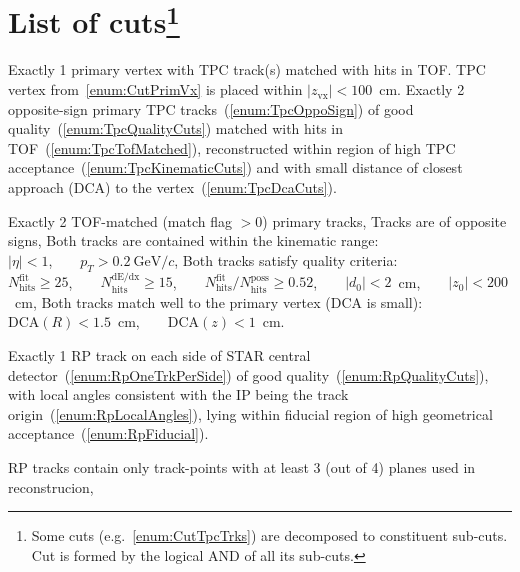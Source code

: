 \section[List of cuts]{List of cuts\footnote{Some cuts (e.g.~\ref{enum:CutTpcTrks}) are decomposed to constituent sub-cuts. Cut is formed by the logical AND of all its sub-cuts.}}\label{sec:listOfCuts}
\begin{enumerate}[label=\textbf{C\arabic*},ref=C\arabic*]
 \itemm Exactly 1 primary vertex with TPC track(s) matched with hits in TOF.\label{enum:CutPrimVx}
 \itemm TPC vertex from~\ref{enum:CutPrimVx} is placed within $|z_{\textrm{vx}}|<100$~cm.\label{enum:CutZVx}
 \itemm Exactly 2 opposite-sign primary TPC tracks~(\ref{enum:TpcOppoSign}) of good quality~(\ref{enum:TpcQualityCuts}) matched with hits in TOF~(\ref{enum:TpcTofMatched}), reconstructed within region of high TPC acceptance~(\ref{enum:TpcKinematicCuts}) and with small distance of closest approach (DCA) to the vertex~(\ref{enum:TpcDcaCuts}).\label{enum:CutTpcTrks}
    \begin{enumerate}[label=\textbf{\theenumi.\arabic*},ref=\theenumi.\arabic*]
      \itemm Exactly 2 TOF-matched (match flag $>0$) primary tracks,\label{enum:TpcTofMatched}
      \itemm Tracks are of opposite signs,\label{enum:TpcOppoSign}
      \itemm Both tracks are contained within the kinematic range:\label{enum:TpcKinematicCuts}\\[2pt]
      $|\eta|<1$,~~~~$p_{T}>0.2~\textrm{GeV}/c$,
      \itemm Both tracks satisfy quality criteria:\label{enum:TpcQualityCuts}\\[2pt]
      $N_{\textrm{hits}}^{\textrm{fit}}\geq25$,~~~~$N_{\textrm{hits}}^{\textrm{dE/dx}}\geq15$,~~~~$N_{\textrm{hits}}^{\textrm{fit}}/N_{\textrm{hits}}^{\textrm{poss}}\geq0.52$,~~~~$|d_{0}|<2$~cm,~~~~$|z_{0}|<200$~cm,
      \itemm Both tracks match well to the primary vertex (DCA is small):\label{enum:TpcDcaCuts}\\[2pt]
      $\textrm{DCA}(R)<1.5$~cm,~~~~$\textrm{DCA}(z)<1$~cm.
    \end{enumerate}
 \itemm Exactly 1 RP track on each side of STAR central detector~(\ref{enum:RpOneTrkPerSide}) of good quality~(\ref{enum:RpQualityCuts}), with local angles consistent with the IP being the track origin~(\ref{enum:RpLocalAngles}), lying within fiducial region of high geometrical acceptance~(\ref{enum:RpFiducial}).\label{enum:CutRpTrks}
      \begin{enumerate}[label=\textbf{\theenumi.\arabic*},ref=\theenumi.\arabic*]
      \itemm RP tracks contain only track-points with at least 3 (out of 4) planes used in reconstrucion,\label{enum:RpQualityCuts}

\end{enumerate}
\end{enumerate}
